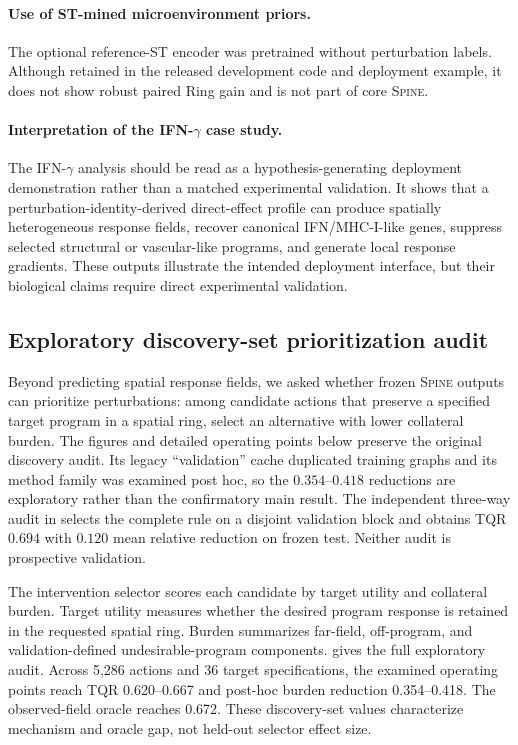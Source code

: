 \documentclass[sigconf,review,balance=false]{acmart}
\newcommand{\methodname}{\textsc{Spine}\xspace}
\begin{document}
\paragraph{Use of ST-mined microenvironment priors.}
The optional reference-ST encoder was pretrained without perturbation labels.
Although retained in the released development code and deployment example, it
does not show robust paired Ring gain and is not part of core \methodname{}.

\paragraph{Interpretation of the IFN-$\gamma$ case study.}
The IFN-$\gamma$ analysis should be read as a hypothesis-generating deployment demonstration rather than a matched experimental validation. It shows that a perturbation-identity-derived direct-effect profile can produce spatially heterogeneous response fields, recover canonical IFN/MHC-I-like genes, suppress selected structural or vascular-like programs, and generate local response gradients. These outputs illustrate the intended deployment interface, but their biological claims require direct experimental validation.

\subsection{Exploratory discovery-set prioritization audit}
\label{app:selector_audit}

Beyond predicting spatial response fields, we asked whether frozen
\methodname{} outputs can prioritize perturbations: among candidate actions
that preserve a specified target program in a spatial ring, select an
alternative with lower collateral burden. The figures and detailed operating
points below preserve the original discovery audit. Its legacy
``validation'' cache duplicated training graphs and its method family was
examined post hoc, so the $0.354$--$0.418$ reductions are exploratory rather
than the confirmatory main result. The independent three-way audit in
 selects the complete rule on a disjoint validation
block and obtains TQR $0.694$ with $0.120$ mean relative reduction on frozen
test. Neither audit is prospective validation.

The intervention selector scores each candidate by target utility and
collateral burden. Target utility measures whether the desired program response
is retained in the requested spatial ring. Burden summarizes far-field,
off-program, and validation-defined undesirable-program components.
 gives the full exploratory audit. Across
5,286 actions and 36 target specifications, the examined operating points reach
TQR 0.620--0.667 and post-hoc burden reduction 0.354--0.418. The observed-field
oracle reaches 0.672. These discovery-set values characterize mechanism and
oracle gap, not held-out selector effect size.
\end{document}
